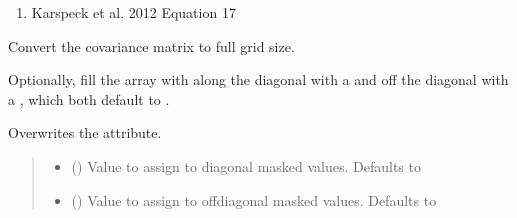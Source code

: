 \documentclass[letterpaper,10pt,english]{sphinxmanual}
\begin{document}
\begin{fulllineitems}
\begin{fulllineitems}
\begin{enumerate}
\item {}
\sphinxAtStartPar
Karspeck et al. 2012  Equation 17

\end{enumerate}

\end{fulllineitems}


\begin{fulllineitems}
\label{\detokenize{ellipse:glomar_gridding.ellipse.EllipseCovarianceBuilder.uncompress_cov}}
\pysigstartsignatures
\pysiglinewithargsret
{}
{\sphinxparamcomma {}}
{}
\pysigstopsignatures
\sphinxAtStartPar
Convert the covariance matrix to full grid size.

\sphinxAtStartPar
Optionally, fill the array with along the diagonal with a
 and off the diagonal with a , which both
default to .

\sphinxAtStartPar
Overwrites the  attribute.
\begin{quote}\begin{description}
\begin{itemize}
\item {}
\sphinxAtStartPar
{} () \textendash{} Value to assign to diagonal masked values. Defaults to 

\item {}
\sphinxAtStartPar
{} () \textendash{} Value to assign to off\sphinxhyphen{}diagonal masked values. Defaults to 

\end{itemize}

\sphinxAtStartPar
{}

\end{description}\end{quote}

\end{fulllineitems}


\end{fulllineitems}
\end{document}
